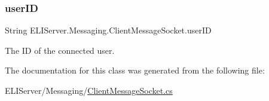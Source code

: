 \subsubsection{\texorpdfstring{user\+ID}{userID}}
{\footnotesize\ttfamily String E\+L\+I\+Server.\+Messaging.\+Client\+Message\+Socket.\+user\+ID}



The ID of the connected user. 



The documentation for this class was generated from the following file\+:\begin{DoxyCompactItemize}
\item 
E\+L\+I\+Server/\+Messaging/\hyperlink{_client_message_socket_8cs}{Client\+Message\+Socket.\+cs}\end{DoxyCompactItemize}
